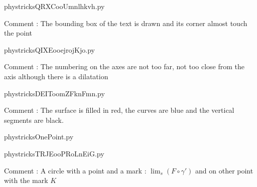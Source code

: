     \newcommand{\CaptionFigQRXCooUmnlhkvh}{<+Type your caption here+>}
    \begin{center}
        
    \end{center}
    phystricksQRXCooUmnlhkvh.py

    Comment : The bounding box of the text is drawn and its corner almost touch the point

    \clearpage
    


    \newcommand{\CaptionFigQIXEooejrojKjo}{<+Type your caption here+>}
    \begin{center}
        
    \end{center}
    phystricksQIXEooejrojKjo.py

    Comment : The numbering on the axes are not too far, not too close from the axis although there is a dilatation

    \clearpage
    


    \newcommand{\CaptionFigDEIToomZFknFmn}{<+Type your caption here+>}
    \begin{center}
        
    \end{center}
    phystricksDEIToomZFknFmn.py

    Comment : The surface is filled in red, the curves are blue and the vertical segments are black.

    \clearpage
    


    \newcommand{\CaptionFigOnePoint}{<+Type your caption here+>}
    \begin{center}
        
    \end{center}
    phystricksOnePoint.py

    

    \clearpage
    


    \newcommand{\CaptionFigTRJEooPRoLnEiG}{<+Type your caption here+>}
    \begin{center}
        
    \end{center}
    phystricksTRJEooPRoLnEiG.py

    Comment : A circle with a point and a mark : $ \lim_{s} (F\circ\gamma')  $ and on other point with the mark $ K $

